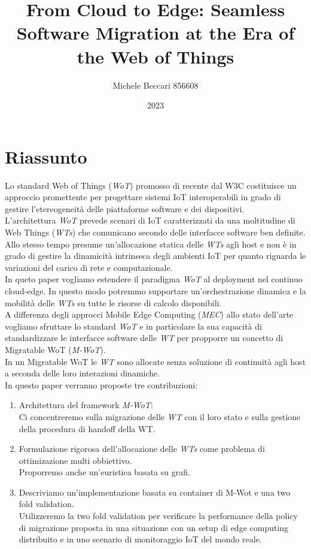 \documentclass[11pt]{article}
\title{ From Cloud to Edge: Seamless Software
	Migration at the Era of the Web of Things}
\author{ Michele Beccari 856608 }
\date{ 2023}
\begin{document}
	\maketitle	
	\pagebreak
	

	
	\section{Riassunto}
	
	Lo standard Web of Things (\textit{WoT}) promosso di recente dal W3C costituisce un approccio promettente per progettare sistemi IoT interoperabili in grado di gestire l'etereogeneità delle piattaforme software e dei dispositivi.
	\\
	L'architettura \textit{WoT} prevede scenari di IoT caratterizzati da una moltitudine di Web Things (\textit{WTs}) che comunicano secondo delle interfacce software ben definite.
	\\
	Allo stesso tempo presume un'allocazione statica delle \textit{WTs} agli host e non è in grado di gestire la dinamicità intrinseca 
	degli ambienti IoT per quanto riguarda  le variazioni del carico di rete e computazionale.
	\\
	In queto paper vogliamo estendere il paradigma \textit{WoT} al deployment nel continuo cloud-edge.
	In questo modo potremmo supportare un'orchestrazione dinamica e la mobilità delle \textit{WTs} su tutte le risorse di calcolo disponibili.
	\\
	A differenza degli approcci Mobile Edge Computing (\textit{MEC}) allo stato dell'arte vogliamo sfruttare lo standard \textit{WoT} e in particolare la sua capacità di standardizzare le interfacce software delle  \textit{WT} per propporre un concetto di Migratable WoT (\textit{M-WoT}).
	\\
	In un Migratable WoT le \textit{WT} sono allocate senza soluzione di continuità agli host a seconda delle loro interazioni dinamiche.
	\\
	In questo paper verranno proposte tre contribuzioni:
	
	\begin{enumerate}
		\item Architettura del framework \textit{M-WoT}: \\
		Ci concentreremo sulla migrazione delle \textit{WT} con il loro stato e sulla gestione della procedura di handoff della WT.
		\item Formulazione rigorosa dell'allocazione delle \textit{WTs} come problema di ottimizazione multi obbiettivo. \\
		Proporremo anche un'euristica basata su grafi.
		\item Descriviamo un'implementazione basata su container di M-Wot e una two fold validation. \\
		Utilizzeremo la two fold validation per verificare la performance della policy di migrazione proposta in una situazione con un setup di edge computing distribuito e in uno scenario di monitoraggio IoT del mondo reale.
	\end{enumerate}
	
\end{document}
